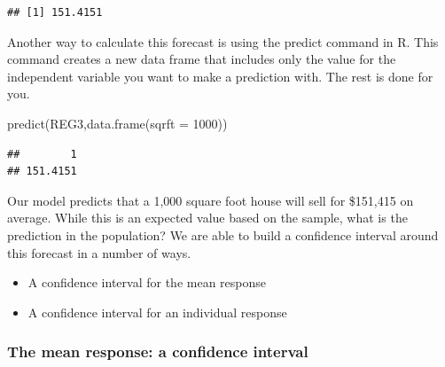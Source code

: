 \documentclass[
]{book}
\newenvironment{Shaded}{\begin{snugshade}}{\end{snugshade}}
\newcommand{\AttributeTok}[1]{\textcolor[rgb]{0.77,0.63,0.00}{#1}}
\newcommand{\DecValTok}[1]{\textcolor[rgb]{0.00,0.00,0.81}{#1}}
\newcommand{\FunctionTok}[1]{\textcolor[rgb]{0.00,0.00,0.00}{#1}}
\newcommand{\NormalTok}[1]{#1}
\newcommand{\OtherTok}[1]{\textcolor[rgb]{0.56,0.35,0.01}{#1}}
\newcommand{\SpecialCharTok}[1]{\textcolor[rgb]{0.00,0.00,0.00}{#1}}
\begin{document}
\begin{Shaded}
\end{Shaded}

\begin{verbatim}
## [1] 151.4151
\end{verbatim}

Another way to calculate this forecast is using the predict command in R. This command creates a new data frame that includes only the value for the independent variable you want to make a prediction with. The rest is done for you.

\begin{Shaded}
\begin{Highlighting}[]
\FunctionTok{predict}\NormalTok{(REG3,}\FunctionTok{data.frame}\NormalTok{(}\AttributeTok{sqrft =} \DecValTok{1000}\NormalTok{))}
\end{Highlighting}
\end{Shaded}

\begin{verbatim}
##        1 
## 151.4151
\end{verbatim}

Our model predicts that a 1,000 square foot house will sell for \$151,415 on average. While this is an expected value based on the sample, what is the prediction in the population? We are able to build a confidence interval around this forecast in a number of ways.

\begin{itemize}
\item
  A confidence interval for the mean response
\item
  A confidence interval for an individual response
\end{itemize}

\hypertarget{the-mean-response-a-confidence-interval}{%
\subsubsection*{The mean response: a confidence interval}\label{the-mean-response-a-confidence-interval}}
\end{document}
